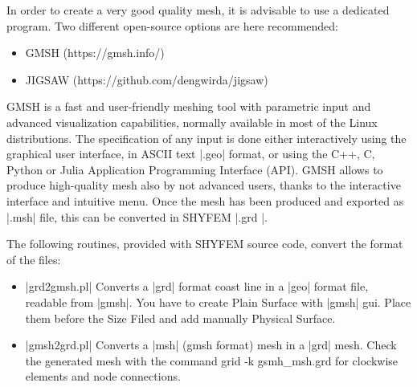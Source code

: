 
%
%
%
%
%
%
%

In order to create a very good quality mesh, it is advisable to use a dedicated program. Two different open-source options are here recommended:
\begin{itemize}
\item GMSH (https://gmsh.info/)
\item JIGSAW (https://github.com/dengwirda/jigsaw)
\end{itemize}

GMSH is a fast and user-friendly meshing tool with parametric input and advanced visualization capabilities,
normally available in most of the Linux distributions. The specification of any input is done either interactively using the graphical user interface, in ASCII text |.geo| format, or using the C++, C, Python or Julia Application Programming Interface (API). GMSH allows to produce high-quality mesh also by not advanced users, thanks to the interactive interface and intuitive menu. Once the mesh has been produced and exported as |.msh| file, this can be converted in SHYFEM |.grd |.

The following routines, provided with SHYFEM source code, convert the format of the files:

\begin{itemize}
     \item |grd2gmsh.pl| Converts a |grd| format coast line in a |geo| format file,
           readable from |gmsh|. You have to create Plain Surface with 
           |gmsh| gui. Place them before the Size Filed and add manually 
           Physical Surface.
     \item |gmsh2grd.pl| Converts a |msh| (gmsh format) mesh in a |grd| mesh. Check the
           generated mesh with the command grid -k gsmh\_msh.grd for
           clockwise elements and node connections.
\end{itemize}


